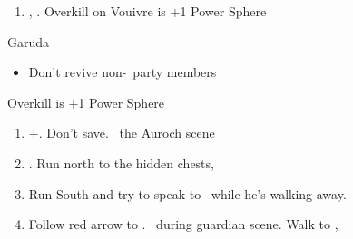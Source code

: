 \begin{enumerate}[resume]
	\item \sd, \skippablefmv. Overkill on Vouivre is +1 Power Sphere
\end{enumerate}
\begin{battle}[1800]{Garuda}
	\begin{itemize}
		\tidusf Haste \auron
		\auronf Attack x3
		\wakkaf Defend, Potion if \tidus\ is less than 312 HP
		\tidusf Attack
		\tidusf Defend
		\wakkaf Defend, Potion if \auron\ is less than 202 HP
		\auronf Attack x3
		\item Don't revive non-\auron\ party members
	\end{itemize}
	Overkill is +1 Power Sphere
\end{battle}
\begin{enumerate}[resume]
	\item \cs+\skippablefmv[1:30]. Don't save. \sd\ the Auroch scene
	\item \cs[4:50]. Run north to the hidden chests, 
	\item Run South and try to speak to \auron\ while he's walking away.
	\item Follow red arrow to \yuna. \sd\ during guardian scene. Walk to \yuna, \cs[4:20]
\end{enumerate}